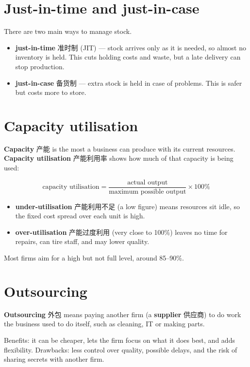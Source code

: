 \documentclass[11pt]{article}
\begin{document}
\section*{Just-in-time and just-in-case}

There are two main ways to manage stock.

\begin{itemize}
\item \textbf{just-in-time} 准时制 (JIT) — stock arrives only as it is needed, so almost no inventory is held. This cuts holding costs and waste, but a late delivery can stop production.

\item \textbf{just-in-case} 备货制 — extra stock is held in case of problems. This is safer but costs more to store.

\end{itemize}

\section*{Capacity utilisation}

\textbf{Capacity} 产能 is the most a business can produce with its current resources. \textbf{Capacity utilisation} 产能利用率 shows how much of that capacity is being used:

\[
\text{capacity utilisation} = \frac{\text{actual output}}{\text{maximum possible output}} \times 100\%
\]

\begin{itemize}
\item \textbf{under-utilisation} 产能利用不足 (a low figure) means resources sit idle, so the fixed cost spread over each unit is high.

\item \textbf{over-utilisation} 产能过度利用 (very close to 100\%) leaves no time for repairs, can tire staff, and may lower quality.

\end{itemize}

Most firms aim for a high but not full level, around 85–90\%.

\section*{Outsourcing}

\textbf{Outsourcing} 外包 means paying another firm (a \textbf{supplier} 供应商) to do work the business used to do itself, such as cleaning, IT or making parts.

Benefits: it can be cheaper, lets the firm focus on what it does best, and adds flexibility. Drawbacks: less control over quality, possible delays, and the risk of sharing secrets with another firm.
\end{document}
